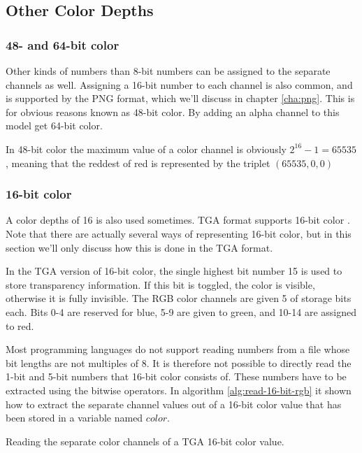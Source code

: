 \subsection{Other Color Depths}
\label{sec:other-channel-sizes}

\subsubsection{48- and 64-bit color}

Other kinds of numbers than 8-bit numbers can be assigned to the
separate channels as well. Assigning a 16-bit number to each channel
is also common, and is supported by the PNG
format\cite{boutel:_png_portab_networ_graph_specif_version12}, which
we'll discuss in chapter \ref{cha:png}. This is for obvious reasons
known as 48-bit color. By adding an alpha channel to this model get
64-bit color.

In 48-bit color the maximum value of a color channel is obviously
$2^{16} - 1 = 65535$, meaning that the reddest of red is represented
by the triplet $(65535, 0, 0)$

\subsubsection{16-bit color}

A color depths of 16 is also used sometimes. TGA format supports
16-bit color \cite{91:_truev_tga_file_format_specif}. Note that there
are actually several ways of representing 16-bit color, but in this
section we'll only discuss how this is done in the TGA format.

In the TGA version of 16-bit color, the single highest bit number 15
is used to store transparency information. If this bit is toggled, the
color is visible, otherwise it is fully invisible. The RGB color
channels are given 5 of storage bits each. Bits 0-4 are reserved for
blue, 5-9 are given to green, and 10-14 are assigned to red.

Most programming languages do not support reading numbers from a file
whose bit lengths are not multiples of 8. It is therefore not possible
to directly read the 1-bit and 5-bit numbers that 16-bit color
consists of. These numbers have to be extracted using the bitwise
operators. In algorithm \ref{alg:read-16-bit-rgb} it shown how to
extract the separate channel values out of a 16-bit color value that
has been stored in a variable named $color$.

\begin{algorithm}[H]
  \caption{Reading the separate color channels of a TGA 16-bit color
    value.}
  \label{alg:read-16-bit-rgb}
  \begin{algorithmic}[1]
  \end{algorithmic}
\end{algorithm}

